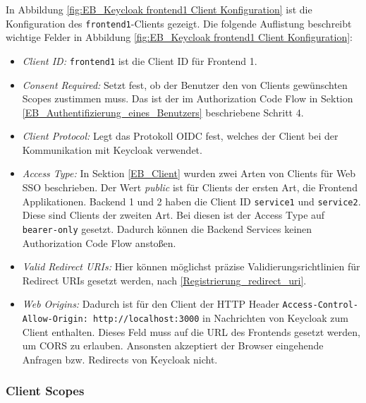 In Abbildung \ref{fig:EB_Keycloak frontend1 Client Konfiguration} ist die Konfiguration des \texttt{frontend1}-Clients gezeigt. Die folgende Auflistung beschreibt wichtige Felder in Abbildung \ref{fig:EB_Keycloak frontend1 Client Konfiguration}:
\begin{itemize}
	\item \emph{Client ID:} \texttt{frontend1} ist die Client ID für Frontend 1.
	
	\item \emph{Consent Required:} Setzt fest, ob der Benutzer den von Clients gewünschten Scopes zustimmen muss. Das ist der im Authorization Code Flow in Sektion \ref{EB_Authentifizierung_eines_Benutzers} beschriebene Schritt 4.
	
	\item \emph{Client Protocol:} Legt das Protokoll OIDC fest, welches der Client bei der Kommunikation mit Keycloak verwendet.
	
	\item \emph{Access Type:} In Sektion \ref{EB_Client} wurden zwei Arten von Clients für Web SSO beschrieben. Der Wert \textit{public} ist für Clients der ersten Art, die Frontend Applikationen. Backend 1 und 2 haben die Client ID \texttt{service1} und \texttt{service2}. Diese sind Clients der zweiten Art. Bei diesen ist der Access Type auf \texttt{bearer-only} gesetzt. Dadurch können die Backend Services keinen Authorization Code Flow anstoßen.
	
	\item \emph{Valid Redirect URIs:} Hier können möglichst präzise Validierungsrichtlinien für Redirect URIs gesetzt werden, nach \ref{Registrierung_redirect_uri}.
	
	\item \emph{Web Origins:} Dadurch ist für den Client der HTTP Header \texttt{Access-Control-Allow-Origin: http://localhost:3000} in Nachrichten von Keycloak zum Client enthalten. Dieses Feld muss auf die URL des Frontends gesetzt werden, um CORS zu erlauben. Ansonsten akzeptiert der Browser eingehende Anfragen bzw. Redirects von Keycloak nicht.
\end{itemize}

\subsubsection{Client Scopes}

